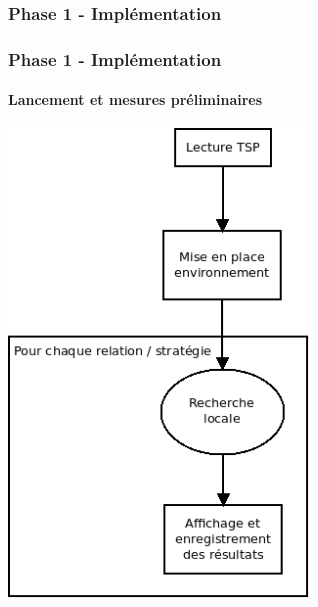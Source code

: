 \documentclass{beamer}
\begin{document}
\begin{frame}
  \frametitle{Phase 1 - Implémentation}
  
  
\end{frame}


\begin{frame}
  \frametitle{Phase 1 - Implémentation}
  \framesubtitle{Lancement et mesures préliminaires}
  
  \begin{center}
  \includegraphics[width=0.6\textwidth,height=0.75\textheight]{images/exec-phase-1.png}
  \end{center}
  
\end{frame}
\end{document}
